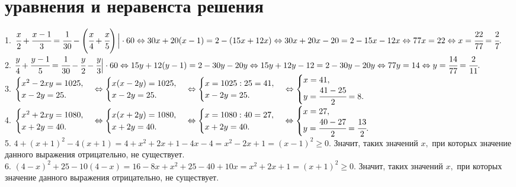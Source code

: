\section{уравнения и неравенста решения}
1. $\cfrac{x}{2}+\cfrac{x-1}{3}=\cfrac{1}{30}-\left(\cfrac{x}{4}+\cfrac{x}{5}\right)\Big|\cdot60\Leftrightarrow30x+20(x-1)=2-(15x+12x)\Leftrightarrow30x+20x-20=2-15x-12x
\Leftrightarrow77x=22\Leftrightarrow x=\cfrac{22}{77}=\cfrac{2}{7}.$\\
2. $\cfrac{y}{4}+\cfrac{y-1}{5}=\cfrac{1}{30}-\cfrac{y}{2}-\cfrac{y}{3}\Big|\cdot60\Leftrightarrow15y+12(y-1)=2-30y-20y\Leftrightarrow15y+12y-12=2-30y-20y
\Leftrightarrow77y=14\Leftrightarrow y=\cfrac{14}{77}=\cfrac{2}{11}.$\\
3. $\begin{cases} x^2-2xy=1025,\\x-2y=25.\end{cases}\Leftrightarrow\begin{cases} x(x-2y)=1025,\\x-2y=25.\end{cases}
\Leftrightarrow\begin{cases} x=1025:25=41,\\x-2y=25.\end{cases}\Leftrightarrow\begin{cases} x=41,\\y=\cfrac{41-25}{2}=8.\end{cases}$\\
4. $\begin{cases} x^2+2xy=1080,\\x+2y=40.\end{cases}\Leftrightarrow\begin{cases} x(x+2y)=1080,\\x+2y=40.\end{cases}\Leftrightarrow\begin{cases} x=1080:40=27,\\x+2y=40.\end{cases}\Leftrightarrow\begin{cases} x=27,\\y=\cfrac{40-27}{2}=\cfrac{13}{2}.\end{cases}$\\
5. $4+(x+1)^2-4(x+1)=4+x^2+2x+1-4x-4=x^2-2x+1=(x-1)^2\geqslant0.$ Значит, таких значений $x,$ при которых значение данного выражения отрицательно, не существует.\\
6. $(4-x)^2+25-10(4-x)=16-8x+x^2+25-40+10x=x^2+2x+1=(x+1)^2\geqslant0.$ Значит, таких значений $x,$ при которых значение данного выражения отрицательно, не существует.\\

